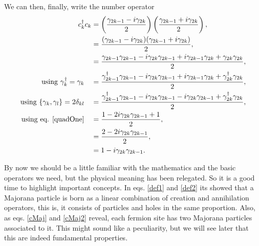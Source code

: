We can then, finally, write the number operator
\begin{equation}
    \begin{aligned}[b]
        c_k^\dagger c_k &=  \left(\frac{\gamma_{2k-1} - i \gamma_{2k}}{2}\right) \left(\frac{\gamma_{2k-1} + i \gamma_{2k}}{2}\right),\\
        & = \frac{(\gamma_{2k-1} - i \gamma_{2k})(\gamma_{2k-1} + i \gamma_{2k})}{2},\\
        & = \frac{\gamma_{2k-1}\gamma_{2k-1} - i \gamma_{2k}\gamma_{2k-1} + i \gamma_{2k-1}\gamma_{2k} +  \gamma_{2k}\gamma_{2k}}{2},\\
        \text{using } \gamma_k^\dagger = \gamma_k \quad &= \frac{\gamma_{2k-1}^\dagger\gamma_{2k-1} - i \gamma_{2k}\gamma_{2k-1} + i \gamma_{2k-1}\gamma_{2k} +  \gamma_{2k}^\dagger\gamma_{2k}}{2},\\
        \text{using } \{\gamma_k,\gamma_l\} = 2\delta_{kl} \quad &= \frac{\gamma_{2k-1}^\dagger\gamma_{2k-1} - i \gamma_{2k}\gamma_{2k-1} - i \gamma_{2k}\gamma_{2k-1} +  \gamma_{2k}^\dagger\gamma_{2k}}{2},\\
        \text{using eq. \ref{quadOne}} \quad &= \frac{1 - 2i \gamma_{2k}\gamma_{2k-1} +  1}{2},\\
        &= \frac{2 - 2i \gamma_{2k}\gamma_{2k-1}}{2},\\
        &= 1 - i\gamma_{2k}\gamma_{2k-1}.
    \end{aligned}
    \label{numMaj}
\end{equation}

By now we should be a little familiar with the mathematics and the basic operators we need, but the physical meaning has been relegated. So it is a good time to highlight important concepts. In eqs. \ref{def1} and \ref{def2} its showed that a Majorana particle is born as a linear combination of creation and annihilation operators, this is, it consists of particles and holes in the same proportion. Also, as eqs. \ref{cMaj} and \ref{cMaj2} reveal, each fermion site has two Majorana particles associated to it. This might sound like a peculiarity, but we will see later that this are indeed fundamental properties.\\


